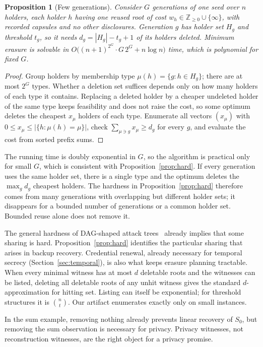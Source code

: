 \documentclass[pdflatex,sn-mathphys-num]{sn-jnl}
\theoremstyle{plain}
\newtheorem{proposition}[theorem]{Proposition}
\theoremstyle{definition}
\begin{document}
\begin{proposition}[Few generations]\label{prop:fewgen}
Consider $G$ generations of one seed over $n$ holders, each holder $h$ having one reused root of cost $w_h\in\mathbb{Z}_{\ge0}\cup\{\infty\}$, with recorded capsules and no other disclosures. Generation $g$ has holder set $H_g$ and threshold $t_g$, so it needs $d_g=|H_g|-t_g+1$ of its holders deleted. Minimum erasure is solvable in $O\big((n+1)^{2^G}\cdot G\,2^G+n\log n\big)$ time, which is polynomial for fixed $G$.
\end{proposition}
\begin{proof}
Group holders by membership type $\mu(h)=\{g:h\in H_g\}$; there are at most $2^G$ types. Whether a deletion set suffices depends only on how many holders of each type it contains. Replacing a deleted holder by a cheaper undeleted holder of the same type keeps feasibility and does not raise the cost, so some optimum deletes the cheapest $x_\mu$ holders of each type. Enumerate all vectors $(x_\mu)$ with $0\le x_\mu\le|\{h:\mu(h)=\mu\}|$, check $\sum_{\mu\ni g}x_\mu\ge d_g$ for every $g$, and evaluate the cost from sorted prefix sums.
\end{proof}

The running time is doubly exponential in $G$, so the algorithm is practical only for small $G$, which is consistent with Proposition~\ref{prop:hard}. If every generation uses the same holder set, there is a single type and the optimum deletes the $\max_gd_g$ cheapest holders. The hardness in Proposition~\ref{prop:hard} therefore comes from many generations with overlapping but different holder sets; it disappears for a bounded number of generations or a common holder set. Bounded reuse alone does not remove it.

The general hardness of DAG-shaped attack trees~\cite{lopuhaa2022} already implies that some sharing is hard. Proposition~\ref{prop:hard} identifies the particular sharing that arises in backup recovery. Credential renewal, already necessary for temporal secrecy (Section~\ref{sec:temporal}), is also what keeps erasure planning tractable. When every minimal witness has at most $d$ deletable roots and the witnesses can be listed, deleting all deletable roots of any unhit witness gives the standard $d$-approximation for hitting set. Listing can itself be exponential; for threshold structures it is $\binom{n}{t}$. Our artifact enumerates exactly only on small instances.

In the sum example, removing nothing already prevents linear recovery of $S_0$, but removing the sum observation is necessary for privacy. Privacy witnesses, not reconstruction witnesses, are the right object for a privacy promise.
\end{document}
